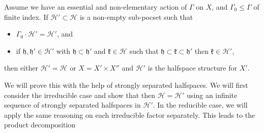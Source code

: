 \begin{prop}
  \label{prop:f-3.32}
  Assume we have an essential and non-elementary action of \(\Gamma\) on \(X\), and \(\Gamma_0 \leq \Gamma\) of finite index. If \(\mathcal{H}' \subset \mathcal{H}\) is a non-empty sub-pocset such that
  \begin{itemize}
  \item \(\Gamma_0 \cdot \mathcal{H}' = \mathcal{H}'\), and
  \item if \(\mathfrak{h}, \mathfrak{h}' \in \mathcal{H}'\) with \(\mathfrak{h} \subset \mathfrak{h}'\) and \(\mathfrak{k} \in \mathcal{H}\) such that \(\mathfrak{h} \subset \mathfrak{k} \subset \mathfrak{h}'\) then \(\mathfrak{k} \in \mathcal{H}'\),
  \end{itemize}
  then either \(\mathcal{H}' = \mathcal{H}\) or \(X = X' \times X''\) and \(\mathcal{H}'\) is the halfspace structure for \(X'\).
\end{prop}

We will prove this with the help of strongly separated halfspaces. We will first consider the irreducible case and show that then \(\mathcal{H} = \mathcal{H}'\) using an infinite sequence of strongly separated halfspaces in \(\mathcal{H}'\). In the reducible case, we will apply the same reasoning on each irreducible factor separately. This leads to the product decomposition





